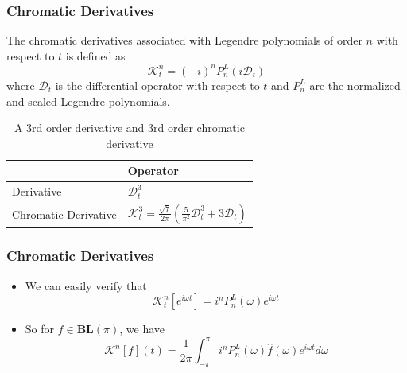 \documentclass{beamer}
\begin{document}
\begin{frame}
\frametitle{Chromatic Derivatives}
The chromatic derivatives associated with Legendre polynomials of order $n$ 
with respect to $t$ is defined as
\begin{equation}
	\mathcal{K}_t^n = (-i)^n P_n^L(i\mathcal{D}_t)
\end{equation}
where $\mathcal{D}_t$ is the differential operator with respect to $t$ and
$P_n^L$ are the normalized and scaled Legendre polynomials.
\pause
\begin{example}
\begin{table}
\begin{tabular}{l l}
 & Operator \\
\midrule
Derivative & $\mathcal{D}_t^3$ \\
Chromatic Derivative & $\mathcal{K}_t^3 = \frac{\sqrt{7}}{2\pi} \left ( \frac{5}{\pi^2} \mathcal{D}_t^3 + 3 \mathcal{D}_t \right )$ \\
\bottomrule
\end{tabular}
\caption{A 3rd order derivative and 3rd order chromatic derivative}
\end{table}
\end{example}
\end{frame}


\begin{frame}
\frametitle{Chromatic Derivatives}
\begin{itemize}
	\item We can easily verify that
		\begin{equation*}
			\mathcal{K}_t^n[e^{i\omega t}] = i^n P_n^L(\omega) e^{i\omega t}
		\end{equation*}
	\item So for $f \in \mathbf{BL}(\pi)$, we have
		\begin{equation}
			\mathcal{K}^n[f](t) = \frac{1}{2\pi} \int_{-\pi}^{\pi} i^n P_n^L(\omega) \hat{f}(\omega) e^{i\omega t} d\omega
		\end{equation}
\end{itemize}
\end{frame}

\end{document}
